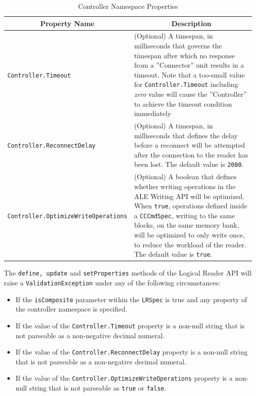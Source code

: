 \documentclass[11pt,a4paper,oneside]{article}
\begin{document}
\begin{table}[!h]
\begin{tabularx}{\textwidth}{|l|X|}
\hline
\multicolumn{1}{|c|}{\textbf{Property Name}}&
\multicolumn{1}{c|}{\textbf{Description}}\\
\hline
\texttt{Controller.Timeout}&(Optional) A timespan, in milliseconds that governs the timespan after which no response from a ''Connector'' unit results in a timeout. Note that a too-small value for \texttt{Controller.Timeout} including \emph{zero} value will cause the ''Controller'' to achieve the timeout condition immediately\\
\hline
\texttt{Controller.ReconnectDelay}&(Optional) A timespan, in milliseconds that defines the delay before a reconnect will be attempted after the connection to the reader has been lost. The default value is \texttt{2000}.\\
\hline
\texttt{Controller.OptimizeWriteOperations}&(Optional) A boolean that defines whether writing operations in the ALE Writing API will be optimized. When \texttt{true}, operations defined inside a \texttt{CCCmdSpec}, writing to the same blocks, on the same memory bank, will be optimized to only write once, to reduce the workload of the reader. The default value is \texttt{true}.\\
\hline
\end {tabularx}
\caption{Controller Namespace Properties}
\MakeLineNo
\end{table}
\FloatBarrier

The \texttt{define, update} and \texttt{setProperties} methods of the Logical Reader API will raise a \texttt{ValidationException} under any of the following circumstances:
\begin{itemize}
\item If the \texttt{isComposite} parameter within the \texttt{LRSpec} is true and any property of the controller namespace is specified.
\item If the value of the \texttt{Controller.Timeout} property is a non-null string that is not parseable as a non-negative decimal numeral.
\item If the value of the \texttt{Controller.ReconnectDelay} property is a non-null string that is not parseable as a non-negative decimal numeral.
\item If the value of the \texttt{Controller.OptimizeWriteOperations} property is a non-null string that is not parseable as \texttt{true} or \texttt{false}.
\end{itemize}
\end{document}
